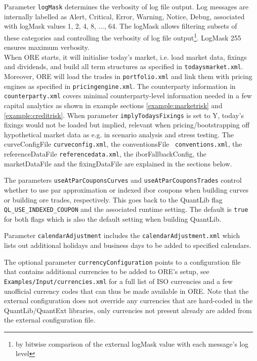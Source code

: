 Parameter {\tt logMask} determines the verbosity of log file output. Log messages are
internally labelled as Alert, Critical, Error, Warning, Notice, Debug, associated with logMask values 1, 2, 4, 8, ..., 64.
The logMask allows filtering subsets of these categories and controlling the verbosity of log file output\footnote{by bitwise comparison of the external logMask value with each message's log level}. LogMask 255 ensures maximum verbosity. \\

When ORE starts, it will initialise today's market, i.e. load market data, fixings and dividends, and build all term
structures as specified in {\tt todaysmarket.xml}.  Moreover, ORE will load the trades in {\tt portfolio.xml} and link
them with pricing engines as specified in {\tt pricingengine.xml}. The counterparty information in {\tt counterparty.xml} covers
minimal counterparty-level information needed in a few capital analytics as shown in example sections \ref{example:marketrisk} and \ref{example:creditrisk}.
When parameter {\tt implyTodaysFixings} is set to Y,
today's fixings would not be loaded but implied, relevant when pricing/bootstrapping off hypothetical market data as
e.g. in scenario analysis and stress testing. The curveConfigFile {\tt curveconfig.xml}, the conventionsFile {\tt
  conventions.xml}, the referenceDataFile {\tt referencedata.xml}, the iborFallbackConfig, the marketDataFile and the
fixingDataFile are explained in the sections below.

\medskip The parameters {\tt useAtParCouponsCurves} and {\tt useAtParCouponsTrades} control whether to use par
approximation or indexed ibor coupons when building curves or building ore trades, respectively. This goes back to the
QuantLib flag \verb+QL_USE_INDEXED_COUPON+ and the associated runtime setting. The default is \verb+true+ for both flags
which is also the default setting when building QuantLib.

\medskip Parameter {\tt calendarAdjustment} includes the {\tt calendarAdjustment.xml} which lists out additional holidays and
business days to be added to specified calendars.

\medskip The optional parameter {\tt currencyConfiguration} points to a configuration file that contains additional currencies
to be added to ORE's setup, see {\tt Examples/Input/currencies.xml} for a full list of ISO currencies and a few unofficial currency
codes that can thus be made available in ORE. Note that the external configuration does not override any currencies that are
hard-coded in the QuantLib/QuantExt libraries, only currencies not present already are added from the external configuration file.

